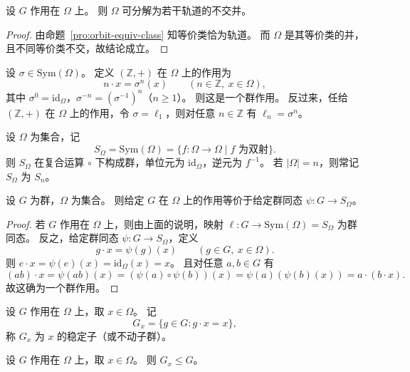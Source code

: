 \documentclass[lang=cn,a4paper,newtx]{elegantbook}
\begin{document}
\begin{corollary}
  设 $G$ 作用在 $\Omega$ 上。
  则 $\Omega$ 可分解为若干轨道的不交并。
\end{corollary}

\begin{proof}
  由命题~\ref{pro:orbit-equiv-class} 知等价类恰为轨道。
  而 $\Omega$ 是其等价类的并，且不同等价类不交，故结论成立。
\end{proof}

\begin{example}
  设 $\sigma\in\mathrm{Sym}(\Omega)$。
  定义 $(\mathbb Z,+)$ 在 $\Omega$ 上的作用为
  \[
    n\cdot x=\sigma^n(x)\qquad (n\in\mathbb Z,\ x\in\Omega),
  \]
  其中 $\sigma^0=\mathrm{id}_{\Omega}$，$\sigma^{-n}=(\sigma^{-1})^n$（$n\ge 1$）。
  则这是一个群作用。
  反过来，任给 $(\mathbb Z,+)$ 在 $\Omega$ 上的作用，令 $\sigma=\ell_1$，则对任意 $n\in\mathbb Z$ 有 $\ell_n=\sigma^n$。
\end{example}

\begin{definition}[对称群]
  设 $\Omega$ 为集合，记
  \[
    S_{\Omega}=\mathrm{Sym}(\Omega)=\{f:\Omega\to\Omega\mid f\text{ 为双射}\}.
  \]
  则 $S_{\Omega}$ 在复合运算 $\circ$ 下构成群，单位元为 $\mathrm{id}_{\Omega}$，逆元为 $f^{-1}$。
  若 $|\Omega|=n$，则常记 $S_{\Omega}$ 为 $S_n$。
\end{definition}

\begin{proposition}
  设 $G$ 为群，$\Omega$ 为集合。
  则给定 $G$ 在 $\Omega$ 上的作用等价于给定群同态 $\psi:G\to S_{\Omega}$。
\end{proposition}

\begin{proof}
  若 $G$ 作用在 $\Omega$ 上，则由上面的说明，映射 $\ell:G\to\mathrm{Sym}(\Omega)=S_{\Omega}$ 为群同态。
  反之，给定群同态 $\psi:G\to S_{\Omega}$，定义
  \[
    g\cdot x=\psi(g)(x)\qquad (g\in G,\ x\in\Omega).
  \]
  则 $e\cdot x=\psi(e)(x)=\mathrm{id}_{\Omega}(x)=x$。
  且对任意 $a,b\in G$ 有
  \[
    (ab)\cdot x=\psi(ab)(x)=(\psi(a)\circ\psi(b))(x)=\psi(a)(\psi(b)(x))=a\cdot(b\cdot x).
  \]
  故这确为一个群作用。
\end{proof}

\begin{definition}[稳定子]
  设 $G$ 作用在 $\Omega$ 上，取 $x\in\Omega$。
  记
  \[
    G_x=\{g\in G:g\cdot x=x\},
  \]
  称 $G_x$ 为 $x$ 的稳定子（或不动子群）。
\end{definition}

\begin{proposition}
  设 $G$ 作用在 $\Omega$ 上，取 $x\in\Omega$。
  则 $G_x\le G$。
\end{proposition}
\end{document}
